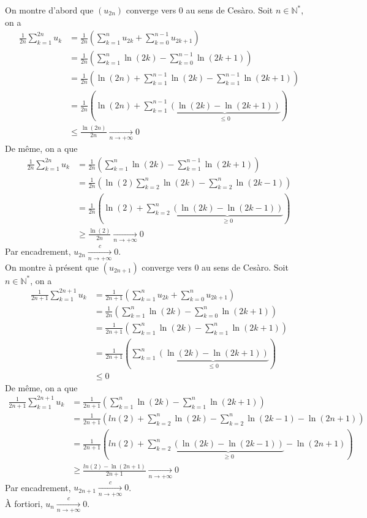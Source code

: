 \documentclass[17pt]{article}
\def\N{\mathbb N}
\begin{document}
\begin{enumerate}[start=4]
\begin{enumerate}
			On montre d'abord que $(u_{2n})$ converge vers $0$ au sens de Cesàro. Soit $n\in\N^*$, on a 
			\begin{align*}
				\frac1{2n}\sum_{k=1}^{2n}u_k &= \frac1{2n}\left(\sum_{k=1}^nu_{2k}+\sum_{k=0}^{n-1}u_{2k+1}\right)\\
											 &= \frac1{2n}\left(\sum_{k=1}^n\ln(2k)-\sum_{k=0}^{n-1}\ln(2k+1)\right)\\
											 &= \frac1{2n}\left(\ln(2n)+\sum_{k=1}^{n-1}\ln(2k)-\sum_{k=1}^{n-1}\ln(2k+1)\right)\\
											 &=\frac1{2n}\left(\ln(2n)+\sum_{k=1}^{n-1}\underbrace{(\ln(2k)-\ln(2k+1))}_{\leq 0}\right)\\
											 &\leq \frac{\ln(2n)}{2n}\xrightarrow[n\rightarrow +\infty ]{}0
			\end{align*}
			De même, on a que 
			\begin{align*}
				\frac1{2n}\sum_{k=1}^{2n}u_k 
											 &= \frac1{2n}\left(\sum_{k=1}^{n}\ln(2k)-\sum_{k=1}^{n-1}\ln(2k+1)\right)\\
											 &= \frac1{2n}\left(\ln(2)\sum_{k=2}^{n}\ln(2k)-\sum_{k=2}^{n}\ln(2k-1)\right)\\
											 &=\frac1{2n}\left(\ln(2)+\sum_{k=2}^{n}\underbrace{(\ln(2k)-\ln(2k-1))}_{\geq 0}\right)\\
											 &\geq \frac{\ln(2)}{2n}\xrightarrow[n\rightarrow +\infty ]{}0
			\end{align*}
			Par encadrement, $u_{2n}\xrightarrow[n\rightarrow +\infty ]{c}0$.\\
			On montre à présent que $(u_{2n+1})$ converge vers 0 au sens de Cesàro. 
			Soit $n\in\N^*$, on a 
			\begin{align*}
				\frac1{2n+1}\sum_{k=1}^{2n+1}u_k &= \frac1{2n+1}\left(\sum_{k=1}^nu_{2k}+\sum_{k=0}^{n}u_{2k+1}\right)\\
											 &= \frac1{2n}\left(\sum_{k=1}^n\ln(2k)-\sum_{k=0}^{n}\ln(2k+1)\right)\\
											 &= \frac1{2n+1}\left(\sum_{k=1}^{n}\ln(2k)-\sum_{k=1}^{n}\ln(2k+1)\right)\\
											 &=\frac1{2n+1}\left(\sum_{k=1}^{n}\underbrace{(\ln(2k)-\ln(2k+1))}_{\leq 0}\right)\\
											 &\leq 0
			\end{align*}
			De même, on a que 
			\begin{align*}
				\frac1{2n+1}\sum_{k=1}^{2n+1}u_k 
											 &= \frac1{2n+1}\left(\sum_{k=1}^{n}\ln(2k)-\sum_{k=1}^{n}\ln(2k+1)\right)\\
											 &= \frac1{2n+1}\left(ln(2)+\sum_{k=2}^{n}\ln(2k)-\sum_{k=2}^{n}\ln(2k-1)-\ln(2n+1)\right)\\
											 &=\frac1{2n+1}\left(ln(2)+\sum_{k=2}^{n}\underbrace{(\ln(2k)-\ln(2k-1))}_{\geq 0}-\ln(2n+1)\right)\\
											 &\geq \frac{ln(2)-\ln(2n+1)}{2n+1}\xrightarrow[n\rightarrow +\infty ]{}0
			\end{align*}
			Par encadrement, $u_{2n+1}\xrightarrow[n\rightarrow +\infty ]{c}0$.\\
			À fortiori, $\boxed{u_{n}\xrightarrow[n\rightarrow +\infty ]{c}0}$.
		\end{enumerate}
	\end{enumerate}
\end{document}
